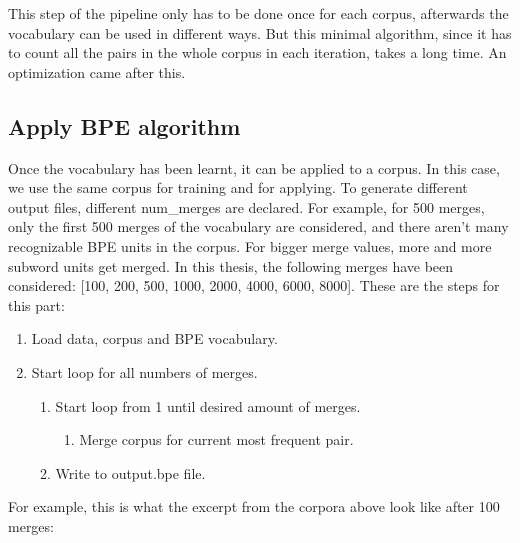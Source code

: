 This step of the pipeline only has to be done once for each corpus, afterwards the vocabulary can be used in different ways. But this minimal algorithm, since it has to count all the pairs in the whole corpus in each iteration, takes a long time. An optimization came after this.

\subsection{Apply BPE algorithm}

Once the vocabulary has been learnt, it can be applied to a corpus. In this case, we use the same corpus for training and for applying. To generate different output files, different num\_merges are declared. For example, for 500 merges, only the first 500 merges of the vocabulary are considered, and there aren't many recognizable BPE units in the corpus. For bigger merge values, more and more subword units get merged. In this thesis, the following merges have been considered: [100, 200, 500, 1000, 2000, 4000, 6000, 8000]. These are the steps for this part:

\begin{enumerate}
	\item Load data, corpus and BPE vocabulary.
	\item Start loop for all numbers of merges.
	\begin{enumerate}
		\item Start loop from 1 until desired amount of merges.
		\begin{enumerate}
			\item Merge corpus for current most frequent pair.
		\end{enumerate}
		\item Write to output.bpe file.
	\end{enumerate}
\end{enumerate}

For example, this is what the excerpt from the corpora above look like after 100 merges:

